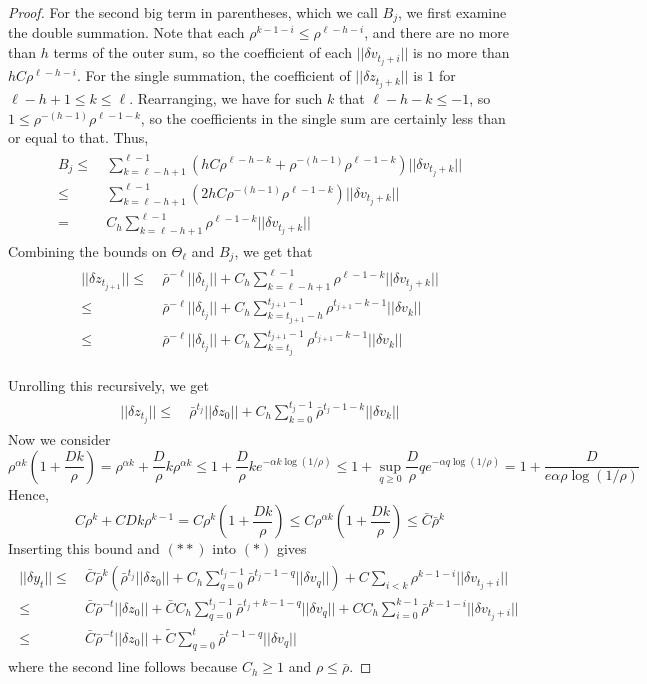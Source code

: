 \documentclass{l4dc2026}
\newcommand{\lp}{\left(}
\newcommand{\rp}{\right)}
\newcommand{\f}[2]{\frac{#1}{#2}}
\newcommand{\lm}{\limits}
\newcommand{\eqspnoa}[1]{\[\begin{aligned}\begin{split} #1 \end{split}\end{aligned}\]}
\newcommand{\eqspnoan}[2]{\begin{align}\tag{#1}\begin{split} #2 \end{split}\end{align}}
\newcommand{\qq}{\\ =\  &}
\newcommand{\qqle}{\\ \le\  &}
\newcommand{\qqsle}{\le\ &}
\begin{document}
\begin{proof}
    For the second big term in parentheses, which we call $B_j$, we first examine the double summation. Note that each $\rho^{k - 1 - i} \le \rho^{\ell - h - i}$, and there are no more than $h$ terms of the outer sum, so the coefficient of each $||\delta v_{t_j + i}||$ is no more than $hC\rho^{\ell - h - i}$. For the single summation, the coefficient of $||\delta z_{t_j + k}||$ is $1$ for $\ell - h + 1 \le k \le \ell$. Rearranging, we have for such $k$ that $\ell - h - k \le -1$, so $1 \le \rho^{-(h-1)}\rho^{\ell - 1 - k}$, so the coefficients in the single sum are certainly less than or equal to that. Thus, \eqspnoa{B_j \qqsle \sum\lm_{k = \ell - h + 1}^{\ell-1}\lp hC\rho^{\ell - h - k} +  \rho^{-(h-1)}\rho^{\ell - 1 - k}\rp||\delta v_{t_j + k}|| \qqle \sum\lm_{k = \ell - h + 1}^{\ell-1}\lp 2hC\rho^{-(h-1)}\rho^{\ell - 1 - k}\rp||\delta v_{t_j + k}|| \qq C_h \sum\lm_{k = \ell - h + 1}^{\ell - 1}\rho^{\ell - 1 - k}||\delta v_{t_j + k}||}
    Combining the bounds on $\Theta_\ell$ and $B_j$, we get that \eqspnoa{||\delta z_{t_{j+1}}|| \qqsle \bar\rho^{-\ell}||\delta_{t_j}|| + C_h\sum\lm_{k = \ell - h + 1}^{\ell - 1}\rho^{\ell - 1 - k}||\delta v_{t_j + k}|| \qqle \bar\rho^{-\ell}||\delta_{t_j}|| + C_h\sum\lm_{k = t_{j+1} - h }^{t_{j+1} - 1}\rho^{t_{j+1} - k - 1}||\delta v_{k}|| \qqle \bar\rho^{-\ell}||\delta_{t_j}|| + C_h\sum\lm_{k = t_{j}}^{t_{j+1} - 1}\rho^{t_{j+1} - k - 1}||\delta v_{k}||}

    Unrolling this recursively, we get \eqspnoan{$**$}{||\delta z_{t_j}|| \qqsle \bar\rho^{t_j}||\delta z_0|| + C_h \sum\lm_{k = 0}^{t_j - 1} \bar\rho^{t_j - 1 - k}||\delta v_{k}||}
    Now we consider \[\rho^{\alpha k}\lp 1 + \f{Dk}{\rho}\rp = \rho^{\alpha k} + \f{D}{\rho} k\rho^{\alpha k} \le 1 + \f{D}{\rho}ke^{-\alpha k\log({1/\rho})} \le 1 + \sup\lm_{q \ge 0}\f{D}{\rho}qe^{-\alpha q\log(1/\rho)} = 1 + \f{D}{e\alpha \rho\log(1/\rho)}\]
    Hence, \[C\rho^k + CDk\rho^{k - 1} = C\rho^k\lp 1 + \f{Dk}{\rho} \rp \le C\rho^{\alpha k} \lp 1 + \f{Dk}{\rho} \rp\le \bar C\bar\rho^k\]
    Inserting this bound and $(**)$ into $(*)$ gives \eqspnoa{||\delta y_t|| \qqsle \bar C\bar\rho^k\lp \bar\rho^{t_j}||\delta z_0|| + C_h \sum\lm_{q = 0}^{t_j - 1} \bar\rho^{t_j - 1 - q}||\delta v_{q}|| \rp + C\sum\lm_{i < k}\rho^{k - 1 - i}||\delta v_{t_j + i}|| \qqle \bar C\bar\rho^{-t}||\delta z_0|| + \bar CC_h\sum\lm_{q = 0}^{t_j - 1}\bar\rho^{t_j + k - 1 - q}||\delta v_q|| + CC_h\sum\lm_{i = 0}^{k - 1}\bar\rho^{k - 1 - i}|| \delta v_{t_j + i}|| \qqle \bar C\bar\rho^{-t}||\delta z_0|| + \tilde{C}\sum\lm_{q = 0}^t\bar\rho^{t - 1 - q}||\delta v_{q}||}
    where the second line follows because $C_h \ge 1$ and $\rho \le \bar\rho$. 

\end{proof}
\end{document}
